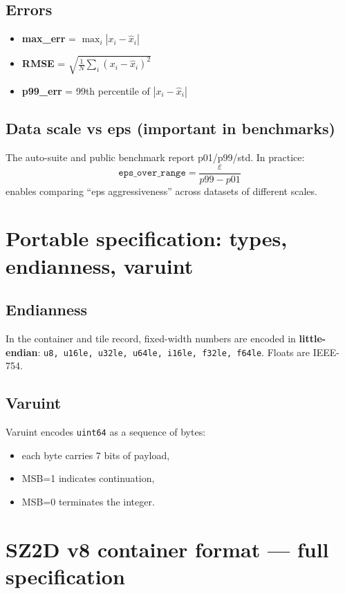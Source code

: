 \documentclass[11pt,a4paper]{article}
\begin{document}
\subsection{Errors}
\begin{itemize}
  \item \textbf{max\_err} = $\max_i |x_i - \hat{x}_i|$
  \item \textbf{RMSE} = $\sqrt{\frac{1}{N}\sum_i (x_i-\hat{x}_i)^2}$
  \item \textbf{p99\_err} = 99th percentile of $|x_i-\hat{x}_i|$
\end{itemize}

\subsection{Data scale vs eps (important in benchmarks)}
The auto-suite and public benchmark report p01/p99/std. In practice:
\[
  \texttt{eps\_over\_range} = \frac{\varepsilon}{p99-p01}
\]
enables comparing ``eps aggressiveness'' across datasets of different scales.

\section{Portable specification: types, endianness, varuint}

\subsection{Endianness}
In the container and tile record, fixed-width numbers are encoded in \textbf{little-endian}:
\texttt{u8, u16le, u32le, u64le, i16le, f32le, f64le}. Floats are IEEE-754.

\subsection{Varuint}
Varuint encodes \texttt{uint64} as a sequence of bytes:
\begin{itemize}
  \item each byte carries 7 bits of payload,
  \item MSB=1 indicates continuation,
  \item MSB=0 terminates the integer.
\end{itemize}

\section{SZ2D v8 container format --- full specification}
\end{document}
